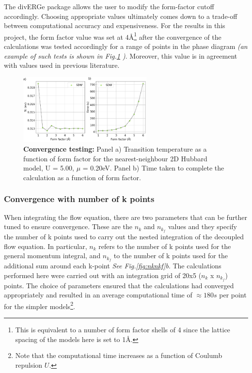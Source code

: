 \documentclass[12pt]{article}
\begin{document}
\medskip


\noindent The divERGe package allows the user to modify the form-factor cutoff accordingly. Choosing appropriate values ultimately comes down to a trade-off 
between computational accuracy and expensiveness. 
For the results in this project, the form factor value was set at 4\AA\footnote{This is equivalent to a number of form factor shells of 4 since the lattice spacing of the models here is set to 1\AA.} after the convergence of  
the calculations was tested accordingly for a range of points in the phase diagram \textit{(an example of such tests is shown in Fig.\ref{fig:Formfactorconvergence} )}. Moreover, this value is in agreement with values used in previous literature\cite{lichtenstein2018functional}. 

\begin{figure}[htbp]  %
    \centering
    \includegraphics[width=0.6\textwidth]{convergence.png}  %
    \caption{\textbf{Convergence testing:} Panel a) Transition temperature as a function of form factor for the nearest-neighbour 2D Hubbard model, U = 5.00, $\mu$ = 0.20eV. Panel b) Time taken to complete the calculation
    as a function of form factor.   }
    \label{fig:Formfactorconvergence}
\end{figure}







\subsubsection{Convergence with number of k points }

When integrating the flow equation, there are two parameters that can be further tuned to ensure convergence.
These are the $n_k$ and $n_{k_f}$ values and they specify the number of k points used to carry out the nested integration of the decoupled flow equation. 
In particular, $n_k$ refers to the number of k points used for the general momentum integral, and $n_{k_f}$ to the number of k points used for 
the additional sum around each k-point \textit{See Fig.\ref{fig:nknkf}b}. The calculations performed here were carried out with an integration 
grid of 20x5 ($n_k$ x $n_{k_f}$) points. The choice of parameters ensured that the calculations had converged appropriately 
and resulted in an average computational time of $\approx 180s$ per point for the simpler models\footnote{Note that the computational time increases as a function of Coulumb repulsion $U$. }. 
\end{document}
